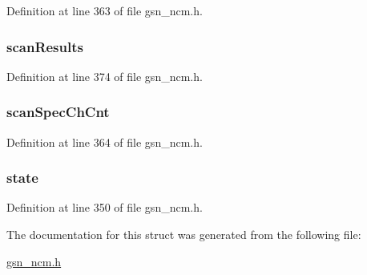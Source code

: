 Definition at line 363 of file gsn\_\-ncm.h.

\hypertarget{a00158_a6333e5f0ce7c1941fa1c766004fedf07}{
\subsubsection[{scanResults}]{ {\bf scanResults}}}
\label{a00158_a6333e5f0ce7c1941fa1c766004fedf07}


Definition at line 374 of file gsn\_\-ncm.h.

\hypertarget{a00158_a6c1e7888f31f25a07d24138a8eea18ea}{
\subsubsection[{scanSpecChCnt}]{ {\bf scanSpecChCnt}}}
\label{a00158_a6c1e7888f31f25a07d24138a8eea18ea}


Definition at line 364 of file gsn\_\-ncm.h.

\hypertarget{a00158_a6e9c4cbd32a1178b12f3a61f6855c896}{
\subsubsection[{state}]{ {\bf state}}}
\label{a00158_a6e9c4cbd32a1178b12f3a61f6855c896}


Definition at line 350 of file gsn\_\-ncm.h.



The documentation for this struct was generated from the following file:\begin{DoxyCompactItemize}
\item 
\hyperlink{a00529}{gsn\_\-ncm.h}\end{DoxyCompactItemize}
